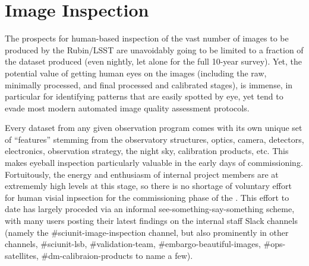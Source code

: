 \section{Image Inspection}
\label{sec:image_inspection}

The prospects for human-based inspection of the vast number of images to be
produced by the Rubin/LSST are unavoidably going to be limited to a 
fraction of the dataset produced (even nightly, let alone for the full 10-year
survey).  Yet, the potential value of getting human eyes on the images (including
the raw, minimally processed, and final processed and calibrated stages), is
immense, in particular for identifying patterns that are easily spotted by eye,
yet tend to evade most modern automated image quality assessment protocols.

Every dataset from any given observation program comes with its own unique set
of ``features'' stemming from the observatory structures, optics, camera,
detectors, electronics, observation strategy, the night sky, calibration products, 
etc.  This makes eyeball inspection particularly valuable in the early days of 
commissioning.  Fortuitously, the energy and enthusiasm of internal project members
are at extrememly high levels at this stage, so there is no shortage of voluntary
effort for human visial inpsection for the commissioning phase of the \ComCam.
This effort to date has largely proceded via an informal
see-something-say-something scheme, with many users posting their latest findings
on the internal staff Slack channels (namely the \#sciunit-image-inspection channel,
but also prominently in other channels, \#sciunit-lsb, \#validation-team,
\#embargo-beautiful-images, \#ops-satellites, \#dm-calibraion-products to name a few).

